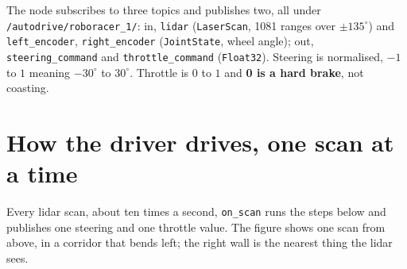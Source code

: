\medskip
The node subscribes to three topics and publishes two, all under
\texttt{/autodrive/roboracer\_1/}: in, \texttt{lidar} (\texttt{LaserScan}, 1081 ranges over
$\pm135^\circ$) and \texttt{left\_encoder}, \texttt{right\_encoder} (\texttt{JointState}, wheel
angle); out, \texttt{steering\_command} and \texttt{throttle\_command} (\texttt{Float32}).
Steering is normalised, $-1$ to $1$ meaning $-30^\circ$ to $30^\circ$. Throttle is $0$ to $1$
and \textbf{0 is a hard brake}, not coasting.

\section{How the driver drives, one scan at a time}
\label{app:driver}

Every lidar scan, about ten times a second, \texttt{on\_scan} runs the steps below and
publishes one steering and one throttle value. The figure shows one scan from above, in a corridor that bends left; the right wall is the nearest thing the lidar sees.

